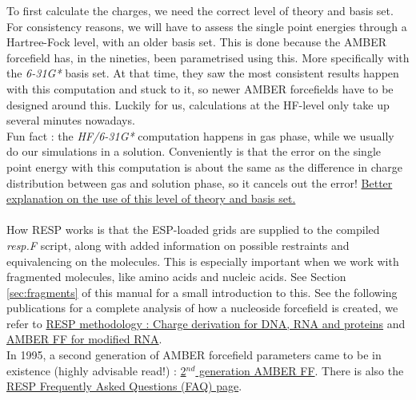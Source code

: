 \documentclass[a4paper]{article}
\begin{document}
To first calculate the charges, we need the correct level of theory and basis set. For consistency reasons, we will have to assess the single point energies through a Hartree-Fock level, with an older basis set. This is done because the AMBER forcefield has, in the nineties, been parametrised using this. More specifically with the \textit{6-31G*} basis set. At that time, they saw the most consistent results happen with this computation and stuck to it, so newer AMBER forcefields have to be designed around this. Luckily for us, calculations at the HF-level only take up several minutes nowadays.\\
Fun fact : the \textit{HF/6-31G*} computation happens in gas phase, while we usually do our simulations in a solution. Conveniently is that the error on the single point energy with this computation is about the same as the difference in charge distribution between gas and solution phase, so it cancels out the error! \href{http://ambermd.org/tutorials/advanced/tutorial1/section1.htm}{Better explanation on the use of this level of theory and basis set.}\\
\\
How RESP works is that the ESP-loaded grids are supplied to the compiled \textit{resp.F} script, along with added information on possible restraints and equivalencing on the molecules. This is especially important when we work with fragmented molecules, like amino acids and nucleic acids. See Section \ref{sec:fragments} of this manual for a small introduction to this. See the following publications for a complete analysis of how a nucleoside forcefield is created, we refer to \href{https://www.semanticscholar.org/paper/Application-of-the-multimolecule-and-RESP-to-Charge-Cieplak-Cornell/c6144b7c679f98097fdf9508387a123b41281f77}{RESP methodology : Charge derivation for DNA, RNA and proteins} and \href{https://pubs.acs.org/doi/abs/10.1021/ct600329w}{AMBER FF for modified RNA}.\\
In 1995, a second generation of AMBER forcefield parameters came to be in existence (highly advisable read!) : \href{https://pubs.acs.org/doi/10.1021/ja00124a002}{2$^{nd}$ generation AMBER FF}.
There is also the \href{http://ambermd.org/Questions/resp.html}{RESP Frequently Asked Questions (FAQ) page}.
\end{document}
